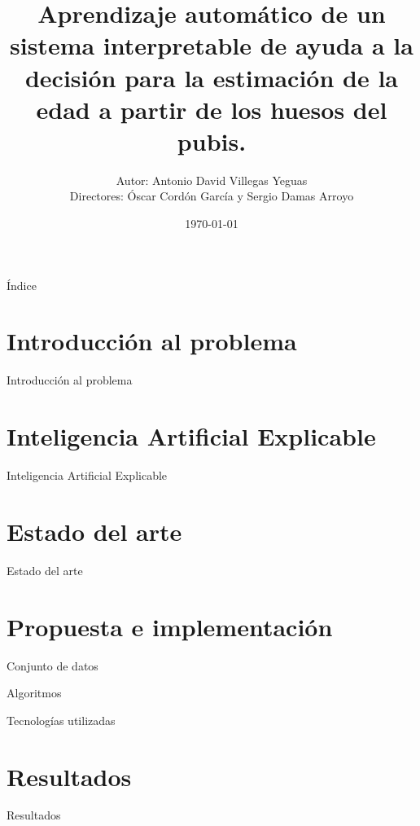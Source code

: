 \documentclass{beamer}
\title{Aprendizaje automático de un sistema interpretable de ayuda a la decisión para la estimación de la edad a partir de los huesos del pubis.}
\date{\today}
\author{\small Autor: Antonio David Villegas Yeguas \\ Directores: Óscar Cordón García y Sergio Damas Arroyo}
\institute[UGR]{Universidad de Granada\\
\medskip
\textit{advy99@correo.ugr.es}\\
\medskip
\url{https://github.com/advy99/TFG}
\doclicenseThis
}
\begin{document}
 \maketitle

\begin{frame}{Índice}
\tableofcontents
\end{frame}




\section{Introducción al problema}
\begin{frame}{Introducción al problema}


\end{frame}


\section{Inteligencia Artificial Explicable}
\begin{frame}{Inteligencia Artificial Explicable}


\end{frame}



\section{Estado del arte}
\begin{frame}{Estado del arte}


\end{frame}

\section{Propuesta e implementación}
\begin{frame}{Conjunto de datos}


\end{frame}

\begin{frame}{Algoritmos}


\end{frame}

\begin{frame}{Tecnologías utilizadas}


\end{frame}

\section{Resultados}
\begin{frame}{Resultados}


\end{frame}
\end{document}
